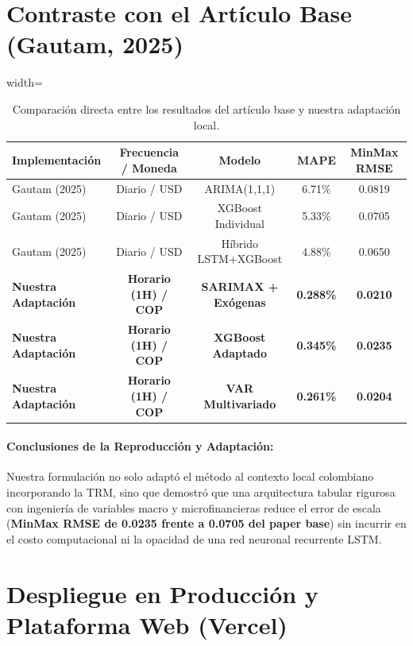 \documentclass[12pt,letterpaper]{article}
\begin{document}
\section{Contraste con el Artículo Base (Gautam, 2025)}

\begin{table}[H]
\centering
\caption{Comparación directa entre los resultados del artículo base y nuestra adaptación local.}
\label{tab:paper_contrast}
\begin{adjustbox}{width=\textwidth}
\begin{tabular}{lcccc}
\toprule
\textbf{Implementación} & \textbf{Frecuencia / Moneda} & \textbf{Modelo} & \textbf{MAPE} & \textbf{MinMax RMSE} \\
\midrule
Gautam (2025) \cite{gautam2025crypto} & Diario / USD & ARIMA(1,1,1) & 6.71\% & 0.0819 \\
Gautam (2025) \cite{gautam2025crypto} & Diario / USD & XGBoost Individual & 5.33\% & 0.0705 \\
Gautam (2025) \cite{gautam2025crypto} & Diario / USD & Híbrido LSTM+XGBoost & 4.88\% & 0.0650 \\
\midrule
\textbf{Nuestra Adaptación} & \textbf{Horario (1H) / COP} & \textbf{SARIMAX + Exógenas} & \textbf{0.288\%} & \textbf{0.0210} \\
\textbf{Nuestra Adaptación} & \textbf{Horario (1H) / COP} & \textbf{XGBoost Adaptado} & \textbf{0.345\%} & \textbf{0.0235} \\
\textbf{Nuestra Adaptación} & \textbf{Horario (1H) / COP} & \textbf{VAR Multivariado} & \textbf{0.261\%} & \textbf{0.0204} \\
\bottomrule
\end{tabular}
\end{adjustbox}
\end{table}

\paragraph{Conclusiones de la Reproducción y Adaptación:}
Nuestra formulación no solo adaptó el método al contexto local colombiano incorporando la TRM, sino que demostró que una arquitectura tabular rigurosa con ingeniería de variables macro y microfinancieras reduce el error de escala (\textbf{MinMax RMSE de 0.0235 frente a 0.0705 del paper base}) sin incurrir en el costo computacional ni la opacidad de una red neuronal recurrente LSTM.

\section{Despliegue en Producción y Plataforma Web (Vercel)}
\end{document}
